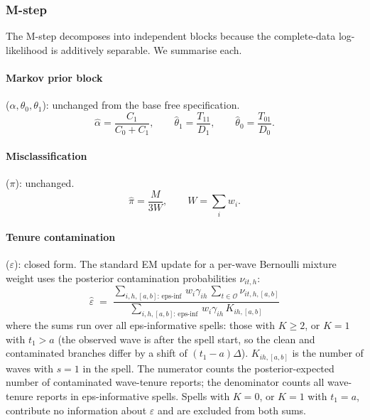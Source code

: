 \subsubsection{M-step}

The M-step decomposes into independent blocks because the complete-data
log-likelihood is additively separable. We summarise each.

\paragraph{Markov prior block} (\(\alpha,\theta_0,\theta_1\)): unchanged
from the base free specification.
\begin{equation}
\hat\alpha = \frac{C_1}{C_0+C_1}, \qquad
\hat\theta_1 = \frac{T_{11}}{D_1}, \qquad
\hat\theta_0 = \frac{T_{01}}{D_0}.
\end{equation}

\paragraph{Misclassification} (\(\pi\)): unchanged.
\begin{equation}
\hat\pi = \frac{M}{3W}, \qquad W = \sum_i w_i.
\end{equation}

\paragraph{Tenure contamination} (\(\varepsilon\)): closed form.
The standard EM update for a per-wave Bernoulli mixture weight uses the
posterior contamination probabilities \(\nu_{it,h}\):
\begin{equation}
\hat\varepsilon \;=\;
\frac{\sum_{i,h,[a,b]:\,\mathrm{eps\text{-}inf}}\, w_i \gamma_{ih}\,
      \sum_{t \in \mathcal{O}} \nu_{it,h,[a,b]}}
     {\sum_{i,h,[a,b]:\,\mathrm{eps\text{-}inf}}\, w_i \gamma_{ih}\, K_{ih,[a,b]}}
\label{eq:eps_mstep}
\end{equation}
where the sums run over all eps-informative spells: those with \(K \ge 2\),
or \(K = 1\) with \(t_1 > a\) (the observed wave is after the spell start,
so the clean and contaminated branches differ by a shift of
\((t_1-a)\Delta\)).
\(K_{ih,[a,b]}\) is the number of waves with \(s = 1\) in the spell.
The numerator counts the posterior-expected number of contaminated
wave-tenure reports; the denominator counts all wave-tenure reports in
eps-informative spells.
Spells with \(K = 0\), or \(K = 1\) with \(t_1 = a\), contribute no
information about \(\varepsilon\) and are excluded from both sums.


